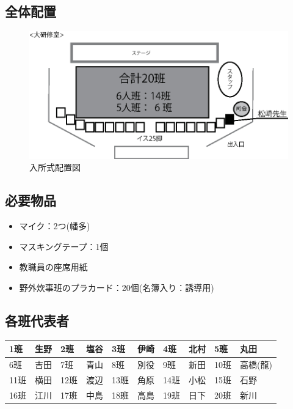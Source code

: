 \subsection{全体配置}
\begin{figure}[H]
  \begin{center}
  \includegraphics[scale=1.5]{./08/nyushoshiki.eps}
  \caption{入所式配置図}
  \label{nyusyosiki}
  \end{center}
\end{figure}


\subsection{必要物品}
\begin{itemize}
\item マイク：2つ(幡多)
\item マスキングテープ：1個
\item 教職員の座席用紙
\item 野外炊事班のプラカード：20個(名簿入り：誘導用)
\end{itemize}


\subsection{各班代表者}
\begin{table}[htb]
  \begin{center}
  \begin{tabular}{|l|l||l|l||l|l||l|l||l|l|} \hline
  1班 & 生野 & 2班 & 塩谷 & 3班 & 伊崎 & 4班 & 北村 & 5班 & 丸田 \\ \hline
  6班 & 吉田 & 7班 & 青山 & 8班 & 別役 & 9班 & 新田 & 10班 & 高橋(龍) \\  \hline
  11班 & 横田 & 12班 & 渡辺 & 13班 & 角原 & 14班 & 小松 & 15班 & 石野 \\ \hline
  16班 & 江川 & 17班 & 中島 & 18班 & 高島 & 19班 & 日下 & 20班 & 新川 \\ \hline
    \end{tabular}
  \end{center}
\end{table}

